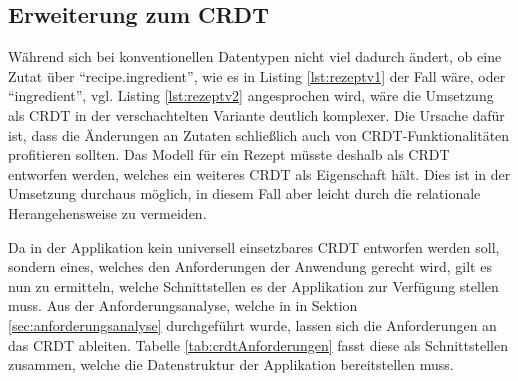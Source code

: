 \documentclass[a4paper, 12pt]{scrreprt}
\begin{document}
\begin{minipage}{\linewidth}

\end{minipage}

\subsection{Erweiterung zum CRDT}
\label{sec:erweiterungCRDT}
Während sich bei konventionellen Datentypen nicht viel dadurch ändert, ob eine Zutat über \enquote{recipe.ingredient}, wie es in Listing \ref{lst:rezeptv1} der Fall wäre, oder \enquote{ingredient}, vgl. Listing \ref{lst:rezeptv2} angesprochen wird, wäre die Umsetzung als CRDT in der verschachtelten Variante deutlich komplexer. Die Ursache dafür ist, dass die Änderungen an Zutaten schließlich auch von CRDT-Funktionalitäten profitieren sollten. Das Modell für ein Rezept müsste deshalb als CRDT entworfen werden, welches ein weiteres CRDT als Eigenschaft hält. Dies ist in der Umsetzung durchaus möglich, in diesem Fall aber leicht durch die relationale Herangehensweise zu vermeiden.

Da in der Applikation kein universell einsetzbares CRDT entworfen werden soll, sondern eines, welches den Anforderungen der Anwendung gerecht wird, gilt es nun zu ermitteln, welche Schnittstellen es der Applikation zur Verfügung stellen muss. Aus der Anforderungsanalyse, welche in in Sektion \ref{sec:anforderungsanalyse} durchgeführt wurde, lassen sich die Anforderungen an das CRDT ableiten. Tabelle \ref{tab:crdtAnforderungen} fasst diese als Schnittstellen zusammen, welche die Datenstruktur der Applikation bereitstellen muss. 
\end{document}
